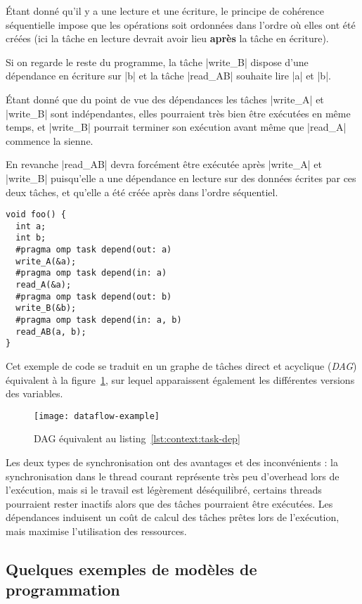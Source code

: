 Étant donné qu'il y a une lecture et une écriture, le principe de cohérence séquentielle impose que les opérations soit ordonnées dans l'ordre où elles ont été créées (ici la tâche en lecture devrait avoir lieu \textbf{après} la tâche en écriture).

Si on regarde le reste du programme, la tâche |write_B| dispose d'une dépendance en écriture sur |b| et la tâche |read_AB| souhaite lire |a| et |b|.

Étant donné que du point de vue des dépendances les tâches |write_A| et |write_B| sont indépendantes, elles pourraient très bien être exécutées en même temps, et |write_B| pourrait terminer son exécution avant même que |read_A| commence la sienne.

En revanche |read_AB| devra forcément être exécutée après |write_A| et |write_B| puisqu'elle a une dépendance en lecture sur des données écrites par ces deux tâches, et qu'elle a été créée après dans l'ordre séquentiel.


\begin{lstlisting}[caption=Synchronisation via des dépendances (OpenMP),label=lst:context:task-dep]
void foo() {
  int a;
  int b;
  #pragma omp task depend(out: a)
  write_A(&a);
  #pragma omp task depend(in: a)
  read_A(&a);
  #pragma omp task depend(out: b)
  write_B(&b);
  #pragma omp task depend(in: a, b)
  read_AB(a, b);
}
\end{lstlisting}

Cet exemple de code se traduit en un graphe de tâches direct et acyclique (\emph{DAG}) équivalent à la figure~\ref{fig:context:dag-dataflow}, sur lequel apparaissent également les différentes versions des variables.

\begin{figure}[ht]
  \centering
  \texttt{[image: dataflow-example]}
  \caption{DAG équivalent au listing~\ref{lst:context:task-dep}}\label{fig:context:dag-dataflow}
\end{figure}

Les deux types de synchronisation ont des avantages et des inconvénients : la synchronisation dans le thread courant représente très peu d'overhead lors de l'exécution, mais si le travail est légèrement déséquilibré, certains threads pourraient rester inactifs alors que des tâches pourraient être exécutées.
Les dépendances induisent un coût de calcul des tâches prêtes lors de l'exécution, mais maximise l'utilisation des ressources.


\subsection{Quelques exemples de modèles de programmation}

